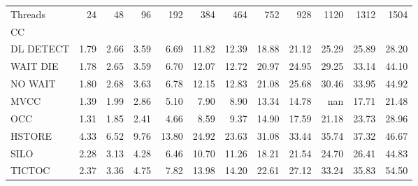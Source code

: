 \begin{tabular}{lrrrrrrrrrrr}
\toprule
Threads &  24   &  48   &  96   &  192  &  384  &  464  &  752  &  928  &  1120 &  1312 &  1504 \\
CC        &       &       &       &       &       &       &       &       &       &       &       \\
\midrule
DL DETECT &  1.79 &  2.66 &  3.59 &  6.69 & 11.82 & 12.39 & 18.88 & 21.12 & 25.29 & 25.89 & 28.20 \\
WAIT DIE  &  1.78 &  2.65 &  3.59 &  6.70 & 12.07 & 12.72 & 20.97 & 24.95 & 29.25 & 33.14 & 44.10 \\
NO WAIT   &  1.80 &  2.68 &  3.63 &  6.78 & 12.15 & 12.83 & 21.08 & 25.68 & 30.46 & 33.95 & 44.92 \\
MVCC      &  1.39 &  1.99 &  2.86 &  5.10 &  7.90 &  8.90 & 13.34 & 14.78 &   nan & 17.71 & 21.48 \\
OCC       &  1.31 &  1.85 &  2.41 &  4.66 &  8.59 &  9.37 & 14.90 & 17.59 & 21.18 & 23.73 & 28.96 \\
HSTORE    &  4.33 &  6.52 &  9.76 & 13.80 & 24.92 & 23.63 & 31.08 & 33.44 & 35.74 & 37.32 & 46.67 \\
SILO      &  2.28 &  3.13 &  4.28 &  6.46 & 10.70 & 11.26 & 18.21 & 21.54 & 24.70 & 26.41 & 44.83 \\
TICTOC    &  2.37 &  3.36 &  4.75 &  7.82 & 13.98 & 14.20 & 22.61 & 27.12 & 33.24 & 35.83 & 54.50 \\
\bottomrule
\end{tabular}
